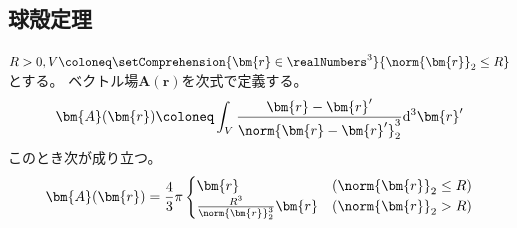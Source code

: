         \subsection{球殻定理}
            \begin{shadebox}
                $R>0,V \coloneq \setComprehension{\bm{r}\in\realNumbers^3}{\norm{\bm{r}}_2\leq R}$とする。
                ベクトル場$\bm{A}(\bm{r})$を次式で定義する。
                \[ \bm{A}(\bm{r}) \coloneq \int_V \frac{\bm{r}-\bm{r}'}{\norm{\bm{r}-\bm{r}'}_2^3} \mathrm{d}^3\bm{r}' \]
                このとき次が成り立つ。
                \[
                    \bm{A}(\bm{r}) = \frac{4}{3}\pi
                    \begin{cases}
                        \bm{r} & (\norm{\bm{r}}_2\leq R) \\
                        \frac{R^3}{\norm{\bm{r}}_2^3}\bm{r} & (\norm{\bm{r}}_2 > R)
                    \end{cases}
                \]
            \end{shadebox}
